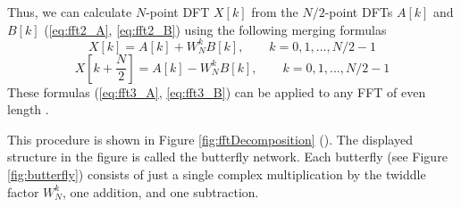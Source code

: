\documentclass[twoside]{ctuthesis}
\theoremstyle{plain}
\theoremstyle{definition}
\theoremstyle{note}
\begin{document}
Thus, we can calculate $N$-point DFT $X[k]$ from the $N/2$-point DFTs $A[k]$ and $B[k]$ (\ref{eq:fft2_A}, \ref{eq:fft2_B}) using the following merging formulas
\begin{equation} \label{eq:fft3_A}
	X[k]=A[k] + W^{k}_{N}B[k],\qquad k=0, 1, ..., N/2 -1
\end{equation}
\begin{equation} \label{eq:fft3_B}
	X[k+\frac{N}{2}]=A[k] - W^{k}_{N}B[k],\qquad k=0, 1, ..., N/2 -1
\end{equation}
These formulas (\ref{eq:fft3_A}, \ref{eq:fft3_B}) can be applied to any FFT of even length \cite{cite:3}.

This procedure is shown in Figure \ref{fig:fftDecomposition} (\cite{cite:3}). The displayed structure in the figure is called the butterfly network. Each butterfly (see Figure \ref{fig:butterfly}) consists of just a single complex multiplication by the twiddle factor $W^{k}_{N}$, one addition, and one subtraction. 
\end{document}
